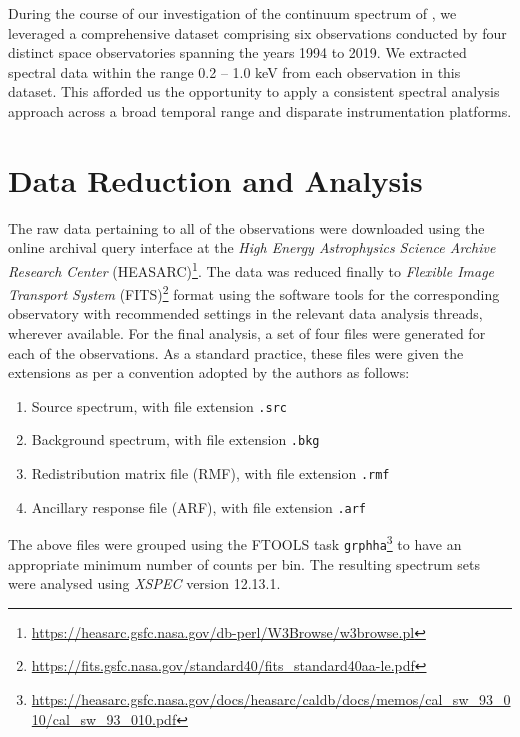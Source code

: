 		During the course of our investigation of the continuum spectrum of \source, we leveraged a comprehensive dataset comprising six observations conducted by four distinct space observatories spanning the years 1994 to 2019. We extracted spectral data within the range 0.2 -- 1.0 keV from each observation in this dataset. This afforded us the opportunity to apply a consistent spectral analysis approach across a broad temporal range and disparate instrumentation platforms.
    
    \section{Data Reduction and Analysis} \label{multi-obs:red-analysis}
    	The raw data pertaining to all of the observations were downloaded using the online archival query interface at the \textit{High Energy Astrophysics Science Archive Research Center} (HEASARC)\footnote{\url{https://heasarc.gsfc.nasa.gov/db-perl/W3Browse/w3browse.pl}}. The data was reduced finally to \textit{Flexible Image Transport System} (FITS)\footnote{\url{https://fits.gsfc.nasa.gov/standard40/fits_standard40aa-le.pdf}} format using the software tools for the corresponding observatory with recommended settings in the relevant data analysis threads, wherever available. For the final analysis, a set of four files were generated for each of the observations. As a standard practice, these files were given the extensions as per a convention adopted by the authors as follows:
	    \begin{enumerate}
	    	\item Source spectrum, with file extension \texttt{.src}
	    	\item Background spectrum, with file extension \texttt{.bkg}
	    	\item Redistribution matrix file (RMF), with file extension \texttt{.rmf}
	    	\item Ancillary response file (ARF), with file extension \texttt{.arf}
	    \end{enumerate}
	    The above files were grouped using the FTOOLS task \texttt{grphha}\footnote{\url{https://heasarc.gsfc.nasa.gov/docs/heasarc/caldb/docs/memos/cal_sw_93_010/cal_sw_93_010.pdf}} to have an appropriate minimum number of counts per bin. The resulting spectrum sets were analysed using \textit{XSPEC} version 12.13.1.
    
